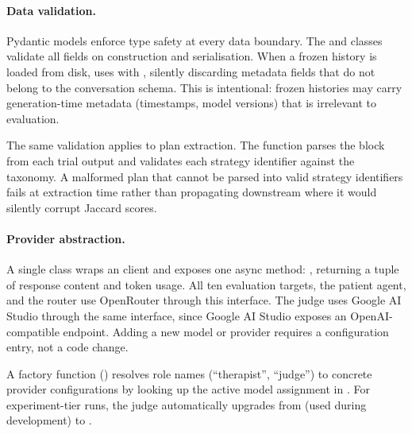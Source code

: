 \paragraph{Data validation.}
Pydantic models enforce type safety at every data boundary. The
 and  classes validate all fields on
construction and serialisation. When a frozen history is loaded from disk,
 uses  with
, silently discarding metadata fields that do not
belong to the conversation schema. This is intentional: frozen histories
may carry generation-time metadata (timestamps, model versions) that is
irrelevant to evaluation.

The same validation applies to plan extraction. The
 function parses the 
block from each trial output and validates each strategy identifier against
the taxonomy. A malformed plan that cannot be parsed into valid strategy
identifiers fails at extraction time rather than propagating downstream
where it would silently corrupt Jaccard scores.

\paragraph{Provider abstraction.}
A single  class wraps an  client
and exposes one async method: ,
returning a tuple of response content and token usage. All ten evaluation
targets, the patient agent, and the router use OpenRouter through this
interface. The  judge uses Google AI Studio through the
same interface, since Google AI Studio exposes an OpenAI-compatible
endpoint. Adding a new model or provider requires a configuration entry,
not a code change.

A factory function () resolves role names
(\eg ``therapist'', ``judge'') to concrete provider configurations by
looking up the active model assignment in . For
experiment-tier runs, the judge automatically upgrades from
 (used during development) to
.


